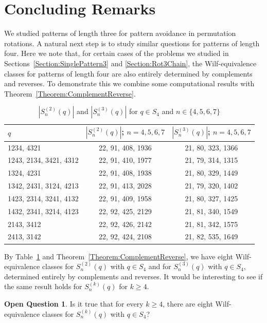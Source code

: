 \documentclass[11pt]{article}
\theoremstyle{definition}
\newtheorem{question}[theorem]{Open Question}
\numberwithin{equation}{section}
\begin{document}
\section{Concluding Remarks}\label{Section:Conclude}
We studied patterns of length three for pattern avoidance in permutation rotations. A natural next step is to study similar 
questions for patterns of length four. Here we note that, for certain cases of the problems we studied in Sections~\ref{Section:SinglePattern3} and \ref{Section:Rot3Chain}, the Wilf-equivalence classes for patterns of length four are also entirely determined by complements and reverses. To demonstrate this we combine some computational results with Theorem~\ref{Theorem:ComplementReverse}.
\begin{table}[H]
\renewcommand{\arraystretch}{1.5}
\centering
\begin{tabular}{|l||c|c|}
\hline
$q$ &$|S^{(2)}_n(q)|$; $n=4,5,6,7$&$|S^{(3)}_n(q)|$; $n=4,5,6,7$\\\hline\hline
1234, 4321&22, 91, 408, 1936&21, 80, 323, 1366\\\hline
1243, 2134, 3421, 4312&22, 91, 410, 1977&21, 79, 314, 1315\\\hline
1324, 4231&22, 91, 408, 1938&21, 80, 329, 1449\\\hline
1342, 2431, 3124, 4213&22, 91, 413, 2028&21, 79, 320, 1402\\\hline
1423, 2314, 3241, 4132&22, 91, 409, 1958&21, 80, 327, 1425\\\hline
1432, 2341, 3214, 4123&22, 92, 425, 2129&21, 81, 340, 1549\\\hline
2143, 3412&22, 92, 426, 2142&21, 81, 342, 1575\\\hline
2413, 3142&22, 92, 424, 2108&21, 82, 535, 1649\\\hline
\end{tabular}
\caption{$|S^{(2)}_n(q)|$ and $|S^{(3)}_n(q)|$ for $q\in S_4$ and $n\in\{4,5,6,7\}$}\label{Table1}
\end{table}



By Table~\ref{Table1} and Theorem~\ref{Theorem:ComplementReverse}, we have eight Wilf-equivalence classes for $S^{(2)}_n(q)$ with $q\in S_4$ and for $S^{(3)}_n(q)$ with $q\in S_4$,  determined entirely by complements and reverses. 
It would be interesting to see if the 
same result holds for $S^{(k)}_n(q)$ for $k\geq4$. 

\begin{question}
    Is it true that for every $k\geq4$, there are eight Wilf-equivalence classes for $S^{(k)}_n(q)$ with $q\in S_4$? 
\end{question}
\end{document}
